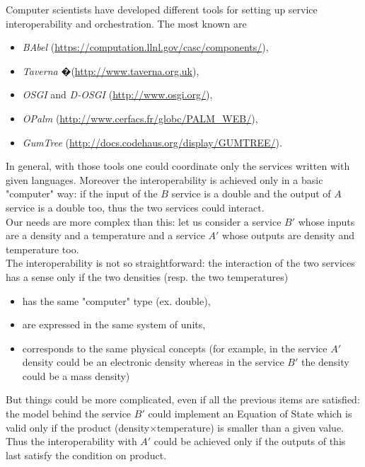 \documentclass[a4paper,11pt] {article}
\begin{document}
Computer scientists have developed different tools for setting up service interoperability and
orchestration. The most known are
\begin{itemize}
\item {\it BAbel} (\href{https://computation.llnl.gov/casc/components/}{https://computation.llnl.gov/casc/components/}),
\item {\it Taverna }�(\href{http://www.taverna.org.uk}{http://www.taverna.org.uk}),
\item {\it OSGI} and {\it D-OSGI } (\href{http://www.osgi.org/}{http://www.osgi.org/}),
\item {\it OPalm} (\href{http://www.cerfacs.fr/globc/PALM_WEB/}{http://www.cerfacs.fr/globc/PALM\_WEB/}),
\item {\it GumTree} (\href{http://docs.codehaus.org/display/GUMTREE/}{http://docs.codehaus.org/display/GUMTREE/}).
\end{itemize}
In general, with those tools one could coordinate only the services written with given languages.
Moreover the interoperability is achieved only in a basic "computer" way: if the input of the $B$
service is a double and the output of $A$ service is a double too, thus the two services could
interact.\\

Our needs are more complex than this: let us consider a service $B'$ whose inputs are a density and
a temperature and a service $A'$ whose outputs are density and temperature too. \\
The interoperability is not so straightforward: the interaction of the two services has a sense only
if the two densities (resp. the two temperatures)
\begin{itemize}
\item has the same "computer" type (ex. double),
\item are expressed in the same system of units,
\item corresponds to the same physical concepts (for example, in the service $A'$ density could be
an electronic density whereas in the service $B'$ the density could be a mass density)
\end{itemize}
But things could be more complicated, even if all the previous items are satisfied: the model behind
the service $B'$ could implement an Equation of State which is valid only if the product
(density$\times$temperature) is smaller than a given value.
Thus the interoperability with $A'$ could be achieved only if the outputs of this last satisfy the
condition on product.\\
\end{document}
